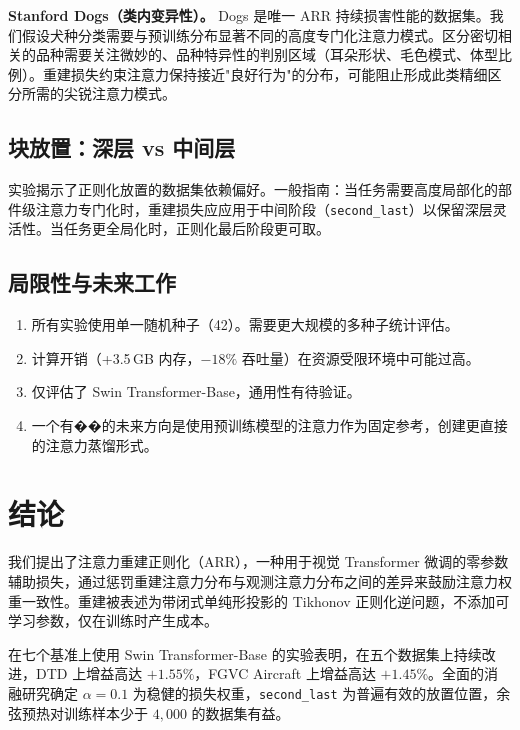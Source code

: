 \documentclass[preprint,12pt]{elsarticle}
\begin{document}
\textbf{Stanford Dogs（类内变异性）。} Dogs 是唯一 ARR 持续损害性能的数据集。我们假设犬种分类需要与预训练分布显著不同的高度专门化注意力模式。区分密切相关的品种需要关注微妙的、品种特异性的判别区域（耳朵形状、毛色模式、体型比例）。重建损失约束注意力保持接近"良好行为"的分布，可能阻止形成此类精细区分所需的尖锐注意力模式。

\subsection{块放置：深层 vs 中间层}

实验揭示了正则化放置的数据集依赖偏好。一般指南：当任务需要高度局部化的部件级注意力专门化时，重建损失应应用于中间阶段（\texttt{second\_last}）以保留深层灵活性。当任务更全局化时，正则化最后阶段更可取。

\subsection{局限性与未来工作}

\begin{enumerate}
    \item 所有实验使用单一随机种子（42）。需要更大规模的多种子统计评估。
    \item 计算开销（+3.5\,GB 内存，$-18\%$ 吞吐量）在资源受限环境中可能过高。
    \item 仅评估了 Swin Transformer-Base，通用性有待验证。
    \item 一个有��的未来方向是使用预训练模型的注意力作为固定参考，创建更直接的注意力蒸馏形式。
\end{enumerate}

\section{结论}

我们提出了注意力重建正则化（ARR），一种用于视觉 Transformer 微调的零参数辅助损失，通过惩罚重建注意力分布与观测注意力分布之间的差异来鼓励注意力权重一致性。重建被表述为带闭式单纯形投影的 Tikhonov 正则化逆问题，不添加可学习参数，仅在训练时产生成本。

在七个基准上使用 Swin Transformer-Base 的实验表明，在五个数据集上持续改进，DTD 上增益高达 $+1.55\%$，FGVC Aircraft 上增益高达 $+1.45\%$。全面的消融研究确定 $\alpha = 0.1$ 为稳健的损失权重，\texttt{second\_last} 为普遍有效的放置位置，余弦预热对训练样本少于 $4{,}000$ 的数据集有益。
\end{document}
